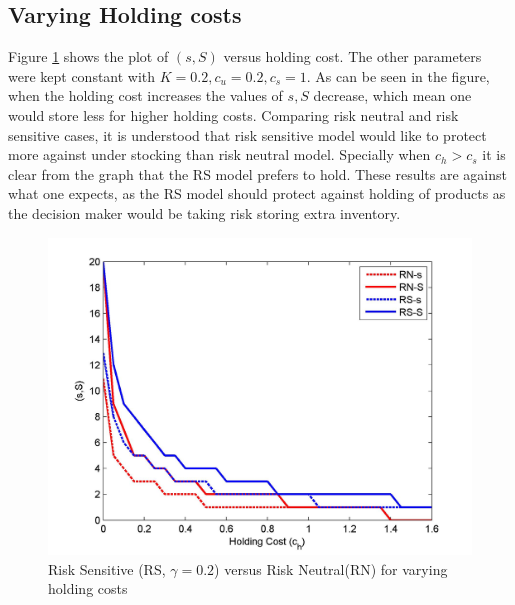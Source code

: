 \documentclass[11pt,a4paper,oneside]{report}
\begin{document}
\subsection{Varying Holding costs}
Figure \ref{fig1} shows the plot of $(s,S)$ versus holding cost. The other parameters were kept constant with $K=0.2, c_u=0.2, c_s=1$.  As can be seen in the figure, when the holding cost increases the values of $s, S$ decrease, which mean one would store less for higher holding costs. Comparing risk neutral and risk sensitive cases, it is understood that risk sensitive model would like to protect more against under stocking than risk neutral model. Specially when $c_h > c_s$ it is clear from the graph that the RS model prefers to hold. These results are against what one expects, as the RS model should protect against holding of products as the decision maker would be taking risk storing extra inventory.
\begin{figure}[H]
\centering
\includegraphics[scale=0.15]{RS0_2vsRNhc}
\caption{Risk Sensitive (RS, $\gamma = 0.2$) versus Risk Neutral(RN) for varying holding costs}
\label{fig1}
\end{figure}
\end{document}
